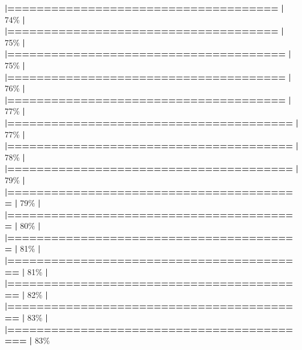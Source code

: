 \documentclass[
]{book}
\newenvironment{Shaded}{\begin{snugshade}}{\end{snugshade}}
\newcommand{\DecValTok}[1]{\textcolor[rgb]{0.00,0.00,0.81}{#1}}
\newcommand{\ErrorTok}[1]{\textcolor[rgb]{0.64,0.00,0.00}{\textbf{#1}}}
\newcommand{\NormalTok}[1]{#1}
\newcommand{\SpecialCharTok}[1]{\textcolor[rgb]{0.81,0.36,0.00}{\textbf{#1}}}
\begin{document}
\begin{Shaded}
\begin{Highlighting}[]
  \ErrorTok{|=====================================}             \ErrorTok{|}  \DecValTok{74}\NormalTok{\%}
  \SpecialCharTok{|}                                                        
  \ErrorTok{|=====================================}             \ErrorTok{|}  \DecValTok{75}\NormalTok{\%}
  \SpecialCharTok{|}                                                        
  \ErrorTok{|======================================}            \ErrorTok{|}  \DecValTok{75}\NormalTok{\%}
  \SpecialCharTok{|}                                                        
  \ErrorTok{|======================================}            \ErrorTok{|}  \DecValTok{76}\NormalTok{\%}
  \SpecialCharTok{|}                                                        
  \ErrorTok{|======================================}            \ErrorTok{|}  \DecValTok{77}\NormalTok{\%}
  \SpecialCharTok{|}                                                        
  \ErrorTok{|=======================================}           \ErrorTok{|}  \DecValTok{77}\NormalTok{\%}
  \SpecialCharTok{|}                                                        
  \ErrorTok{|=======================================}           \ErrorTok{|}  \DecValTok{78}\NormalTok{\%}
  \SpecialCharTok{|}                                                        
  \ErrorTok{|=======================================}           \ErrorTok{|}  \DecValTok{79}\NormalTok{\%}
  \SpecialCharTok{|}                                                        
  \ErrorTok{|========================================}          \ErrorTok{|}  \DecValTok{79}\NormalTok{\%}
  \SpecialCharTok{|}                                                        
  \ErrorTok{|========================================}          \ErrorTok{|}  \DecValTok{80}\NormalTok{\%}
  \SpecialCharTok{|}                                                        
  \ErrorTok{|========================================}          \ErrorTok{|}  \DecValTok{81}\NormalTok{\%}
  \SpecialCharTok{|}                                                        
  \ErrorTok{|=========================================}         \ErrorTok{|}  \DecValTok{81}\NormalTok{\%}
  \SpecialCharTok{|}                                                        
  \ErrorTok{|=========================================}         \ErrorTok{|}  \DecValTok{82}\NormalTok{\%}
  \SpecialCharTok{|}                                                        
  \ErrorTok{|=========================================}         \ErrorTok{|}  \DecValTok{83}\NormalTok{\%}
  \SpecialCharTok{|}                                                        
  \ErrorTok{|==========================================}        \ErrorTok{|}  \DecValTok{83}\NormalTok{\%}

\end{Highlighting}
\end{Shaded}
\end{document}
